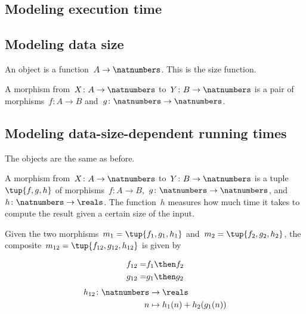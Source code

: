 

\section{}



\subsection{Modeling execution time}


\subsection{Modeling data size}

An object is a function~$A \to \natnumbers $. This is the size function.

A morphism from~$X\colon A \to \natnumbers$ to~$Y\colon B \to \natnumbers$ is a pair of morphisms~$f\colon A \to B$ and~$g\colon \natnumbers \to \natnumbers$.


\subsection{Modeling data-size-dependent running times}

The objects are the same as before.

A morphism from~$X\colon A \to \natnumbers$ to~$Y\colon B \to \natnumbers$ is a tuple~$\tup{f, g, h}$ of morphisms~$f\colon A \to B$,~$g\colon \natnumbers \to \natnumbers$, and~$h\colon \natnumbers \to \reals$.
The function~$h$ measures how much time it takes to compute the result given a certain size of the input.

Given the two morphisms~$m_1 = \tup{f_1, g_1, h_1}$ and~$m_2 = \tup{f_2, g_2, h_2}$, the composite~$m_{12} = \tup{f_{12}, g_{12}, h_{12}}$ is given by

\begin{eqnarray}
  f_{12} =& f_1 \then f_2 \\
  g_{12} =& g_1 \then g_2 \\
\end{eqnarray}
%
\begin{eqnarray}
  h_{12} \colon \natnumbers & \to \reals \\
  n & \mapsto h_1(n) + h_2( g_1 (n))
\end{eqnarray}
